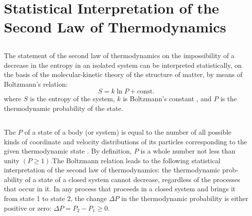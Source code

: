 \section{Statistical Interpretation of the Second Law of Thermodynamics}
\label{sec-11.5}


\subsection{}\label{11.5.1} The statement of the second law of thermodynamics on the impossibility of a decrease in the entropy in an isolated system  can be interpreted statistically, on the basis of the molecular-kinetic theory of the structure of matter, by means of Boltzmann's relation:
\begin{equation*}%
S = k \ln P + \textrm{const.}
\end{equation*}
where $S$ is the entropy of the system, $k$ is Boltzmann's constant , and $P$ is the thermodynamic probability of the state. 

\subsection{}\label{11.5.2} The  $P$ of a state of a body (or system) is equal to the number of all possible kinds of coordinate and velocity distributions of its particles corresponding to the given thermodynamic state . By definition, $P$ is a whole number not less than unity $(P \geq 1)$.The Boltzmann relation  leads to the following statistical interpretation of the second law of thermodynamics: the thermodynamic prob­ ability of a state of a closed system cannot decrease, regardless of the processes that occur in it. In any process that proceeds in a closed system and brings it from state 1 to state 2, the change $\Delta P$ in the thermodynamic probability is either posi­tive or zero: $\Delta P = P_{2} - P_{1} \geq 0$.

